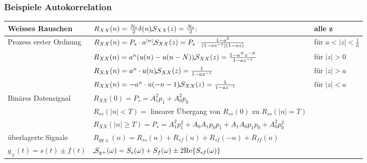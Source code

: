 \subsubsection{Beispiele Autokorrelation}
\begin{tabular}{|l|l|l|}
    \hline
        Weisses Rauschen
        & $R_{XX} (n) = \frac {N_0}{2} \delta(n) \FT S_{XX}(z)= \frac {N_0}{2};\hspace{0.25cm}$ & alle z\\
    \hline
        Prozess erster Ordnung
        & $R_{XX} (n) = P_s \cdot a^{|n|} \FT S_{XX} (z) = P_s \cdot \frac {1-a^2}{(1-az^{-1})(1-az)}$ & für $a<|z| < \frac{1}{a}$\\
    \hline
        
        & $R_{XX} (n) = a^n(u(n) - u(n-N)) \FT S_{XX} (z) = \frac{1-a^Nz^{-N}}{1-az^{-1}}$ & für $|z| > 0$\\
    \hline
        
        & $R_{XX} (n) = a^n \cdot u(n) \FT S_{XX} (z) = \frac{1}{1-az^{-1}}$ & für $|z| > a$\\
    \hline
        
        & $R_{XX} (n) = -a^n \cdot u(-n-1) \FT S_{XX} (z) = \frac{1}{1-az^{-1}}$ & für $|z| < a$\\
    \hline
        Binäres Datensignal
        & $R_{XX} (0) = P_s = A_1^2p_1 + A_0^2 p_0 $ &\\
        &$R_{ss} (|n| < T) = $ linearer Übergang von $R_{ss}(0)$ zu $R_{ss} (|n| = T)$ &\\
        & $R_{XX} (|n| \geq T) = P_s = A_1^2p_1^2 + A_0A_1p_0p_1 + A_1A_0p_1p_0 + A_0^2p_0^2$ &  \\
    \hline
        überlagerte Signale
        & $R_{gg\pm}(n) = R_{ss}(n) + R_{sf}(n) + R_{sf}(-n) + R_{ff}(n) $ &\\
        $g_\pm(t) = s(t) \pm f(t)$
        &  $\FT S_{g+}(\omega) = S_{s}(\omega) + S_{f}(\omega) \pm 2 \text{Re} \{S_{sf}(\omega) \}$ &\\ 
    \hline
\end{tabular} 
\vspace{-0.5cm}
